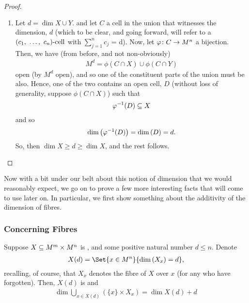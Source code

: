 \begin{proof}
\begin{enumerate}
    \item Let $d = \dim{X \cup Y}$. and let $C$ a cell in the union that witnesses the dimension, $d$ (which to be clear, and going forward, will refer to a $(c_1, \ \hdots, \ c_{n})\textrm{-cell}$ with $\sum_{j=1}^{n} c_j$ = d). Now, let $\varphi \colon C \to M^n$ a  bijection. Then, we have (from before, and not non-obviously)
        \begin{align*}
          M^d = \phi(C \cap X) \cup \phi(C \cap Y)
        \end{align*}
        open (by $M^d$ open), and so one of the constituent parts of the union must be also. Hence, one of the two contains an open cell, $D$ (without loss of generality, suppose $\phi(C \cap X)$) such that 
        \begin{align*}
          \varphi^{-1}(D) \subseteq X
        \end{align*}
        and so
        \begin{align*}
          \operatorname{dim}\left(\varphi^{-1}(D)\right) = \operatorname{dim}\left(D\right) = d.
        \end{align*}
        So, then $\dim{X} \geq d \geq \dim{X}$, and the rest follows.
  \end{enumerate}
\end{proof}

Now with a bit under our belt about this notion of dimension that we would reasonably expect, we go on to prove a few more interesting facts that will come to use later on. In particular, we first show something about the additivity of the dimension of fibres.

\subsubsection{Concerning Fibres}

\begin{proposition}
  \label{prop:fibre_add}
  Suppose $X \subseteq M^m \times M^n$ is , and some positive natural number $d \leq n$. Denote
  \begin{align*}
    X(d) = \Set{x \in M^n}{\dim{X_x} = d},
  \end{align*}
  recalling, of course, that $X_x$ denotes the fibre of $X$ over $x$ (for any who have forgotten). Then, $X(d)$ is  and
  \begin{align*}
    \dim{ \bigcup_{x \in X(d)} \left( \{x\} \times X_x \right) } = \dim{X(d)} + d
  \end{align*}
\end{proposition}

